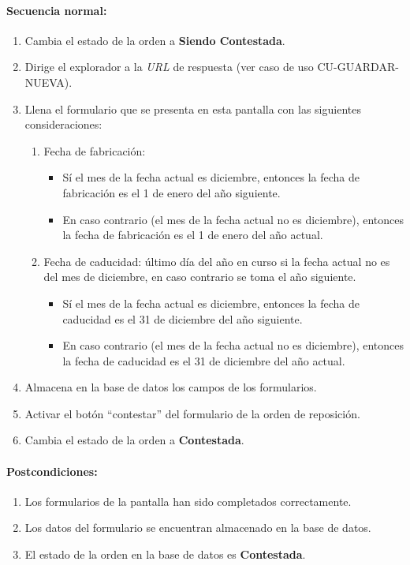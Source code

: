 \paragraph{Secuencia normal:}
\begin{enumerate}
  \item Cambia el estado de la orden a \textbf{Siendo Contestada}.
  \item Dirige el explorador a la \textit{URL} de respuesta (ver caso de uso CU-GUARDAR-NUEVA).
  \item Llena el formulario que se presenta en esta pantalla con las siguientes consideraciones:
  \begin{enumerate}
    \item Fecha de fabricación:
    \begin{itemize}
      \item Sí el mes de la fecha actual es diciembre, entonces la fecha de fabricación es el 1 de enero del año siguiente.
      \item En caso contrario (el mes de la fecha actual no es diciembre), entonces la fecha de fabricación es el 1 de enero del año actual.
    \end{itemize}
    \item Fecha de caducidad: último día del año en curso si la fecha actual no es del mes de diciembre, en caso contrario se toma el año siguiente.
    \begin{itemize}
      \item Sí el mes de la fecha actual es diciembre, entonces la fecha de caducidad es el 31 de diciembre del año siguiente.
      \item En caso contrario (el mes de la fecha actual no es diciembre), entonces la fecha de caducidad es el 31 de diciembre del año actual.
    \end{itemize}
  \end{enumerate}
  \item Almacena en la base de datos los campos de los formularios.
  \item Activar el botón ``contestar'' del formulario de la orden de reposición.
  \item Cambia el estado de la orden a \textbf{Contestada}.
\end{enumerate}
\paragraph{Postcondiciones:}
\begin{enumerate}
  \item Los formularios de la pantalla han sido completados correctamente.
  \item Los datos del formulario se encuentran almacenado en la base de datos.
  \item El estado de la orden en la base de datos es \textbf{Contestada}.
\end{enumerate}
